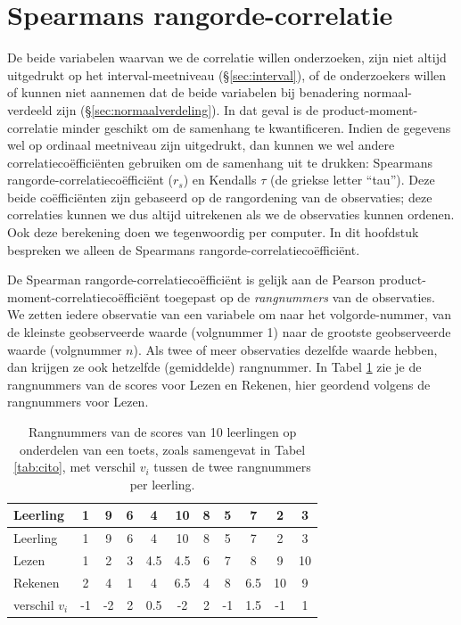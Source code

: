 \documentclass[
]{book}
\begin{document}
\section{Spearmans rangorde-correlatie}\label{sec:Spearman}

De beide variabelen waarvan we de correlatie willen onderzoeken, zijn
niet altijd uitgedrukt op het interval-meetniveau
(§\ref{sec:interval}), of de onderzoekers willen of kunnen niet aannemen dat
de beide variabelen bij benadering normaal-verdeeld zijn
(§\ref{sec:normaalverdeling}).
In dat geval is de
product-moment-correlatie minder geschikt om de samenhang te
kwantificeren. Indien de gegevens wel op ordinaal meetniveau zijn
uitgedrukt, dan kunnen we wel andere correlatiecoëfficiënten gebruiken
om de samenhang uit te drukken: Spearmans rangorde-correlatiecoëfficiënt
(\(r_s\)) en Kendalls \(\tau\) (de griekse letter ``tau''). Deze beide
coëfficiënten zijn gebaseerd op de rangordening van de observaties; deze
correlaties kunnen we dus altijd uitrekenen als we de observaties kunnen
ordenen. Ook deze berekening doen we tegenwoordig per computer. In dit
hoofdstuk bespreken we alleen de Spearmans
rangorde-correlatiecoëfficiënt.

De Spearman rangorde-correlatiecoëfficiënt is gelijk aan de Pearson
product-moment-correlatiecoëfficiënt toegepast op de \emph{rangnummers} van de
observaties. We zetten iedere observatie van een variabele om naar het
volgorde-nummer, van de kleinste geobserveerde waarde (volgnummer 1)
naar de grootste geobserveerde waarde (volgnummer \(n\)). Als twee of meer
observaties dezelfde waarde hebben, dan krijgen ze ook hetzelfde
(gemiddelde) rangnummer. In
Tabel \ref{tab:cito-rangnummers} zie je de rangnummers van de scores
voor Lezen en Rekenen, hier geordend volgens de rangnummers voor Lezen.

\begin{longtable}[]{@{}lcccccccccc@{}}
\caption{\label{tab:cito-rangnummers} Rangnummers van de scores van 10 leerlingen op onderdelen van een toets, zoals samengevat in Tabel \ref{tab:cito}, met verschil \(v_i\) tussen de twee rangnummers per leerling.}\tabularnewline
\toprule\noalign{}
Leerling & 1 & 9 & 6 & 4 & 10 & 8 & 5 & 7 & 2 & 3 \\
\midrule\noalign{}
\endfirsthead
\toprule\noalign{}
Leerling & 1 & 9 & 6 & 4 & 10 & 8 & 5 & 7 & 2 & 3 \\
\midrule\noalign{}
\endhead
\bottomrule\noalign{}
\endlastfoot
Lezen & 1 & 2 & 3 & 4.5 & 4.5 & 6 & 7 & 8 & 9 & 10 \\
Rekenen & 2 & 4 & 1 & 4 & 6.5 & 4 & 8 & 6.5 & 10 & 9 \\
verschil \(v_i\) & -1 & -2 & 2 & 0.5 & -2 & 2 & -1 & 1.5 & -1 & 1 \\
\end{longtable}
\end{document}
